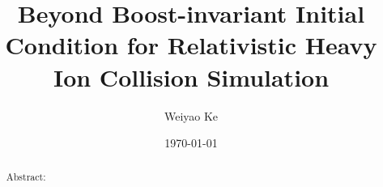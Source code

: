 \documentclass[aps,prl,twocolumn,groupedaddress]{revtex4-1}
\begin{document}

\title{Beyond Boost-invariant Initial Condition for Relativistic Heavy Ion Collision Simulation}


\author{Weiyao Ke}


\date{\today}

\begin{abstract}
Abstract:
\end{abstract}

\pacs{}

\maketitle

\end{document}
